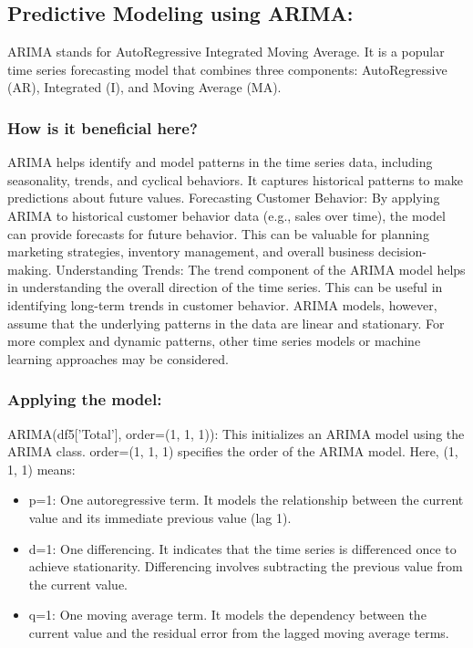 \subsection{Predictive Modeling using ARIMA: }
ARIMA stands for AutoRegressive Integrated Moving Average. It is a popular time series forecasting model that combines three components: AutoRegressive (AR), Integrated (I), and Moving Average (MA).

\subsubsection{How is it beneficial here? }
ARIMA helps identify and model patterns in the time series data, including seasonality, trends, and cyclical behaviors. It captures historical patterns to make predictions about future values.
\newline 
\newline 
Forecasting Customer Behavior: By applying ARIMA to historical customer behavior data (e.g., sales over time), the model can provide forecasts for future behavior. This can be valuable for planning marketing strategies, inventory management, and overall business decision-making.
\newline 
\newline 
Understanding Trends: The trend component of the ARIMA model helps in understanding the overall direction of the time series. This can be useful in identifying long-term trends in customer behavior.
\newline 
\newline 
ARIMA models, however, assume that the underlying patterns in the data are linear and stationary. For more complex and dynamic patterns, other time series models or machine learning approaches may be considered.


\subsubsection{Applying the model:}
ARIMA(df5['Total'], order=(1, 1, 1)): This initializes an ARIMA model using the ARIMA class.
order=(1, 1, 1) specifies the order of the ARIMA model. Here, (1, 1, 1) means:

\begin{itemize}
    \item p=1: One autoregressive term. It models the relationship between the current value and its immediate previous value (lag 1).
    
    \item d=1: One differencing. It indicates that the time series is differenced once to achieve stationarity. Differencing involves subtracting the previous value from the current value.

    \item q=1: One moving average term. It models the dependency between the current value and the residual error from the lagged moving average terms.
\end{itemize}

